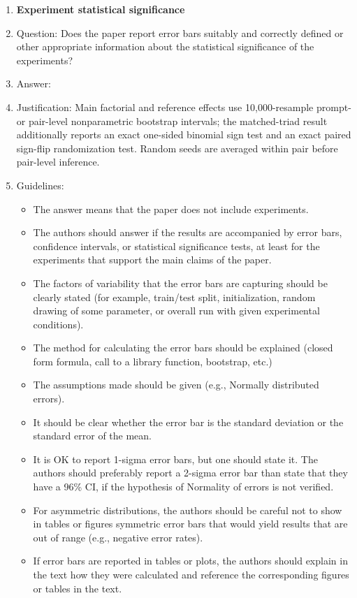 \documentclass[
]{article}
\begin{document}
\begin{enumerate}
\item {\bf Experiment statistical significance}
    \item[] Question: Does the paper report error bars suitably and correctly defined or other appropriate information about the statistical significance of the experiments?
    \item[] Answer: \answerYes{} %
    \item[] Justification: Main factorial and reference effects use 10,000-resample prompt- or pair-level nonparametric bootstrap intervals; the matched-triad result additionally reports an exact one-sided binomial sign test and an exact paired sign-flip randomization test. Random seeds are averaged within pair before pair-level inference.
    \item[] Guidelines:
    \begin{itemize}
        \item The answer \answerNA{} means that the paper does not include experiments.
        \item The authors should answer \answerYes{} if the results are accompanied by error bars, confidence intervals, or statistical significance tests, at least for the experiments that support the main claims of the paper.
        \item The factors of variability that the error bars are capturing should be clearly stated (for example, train/test split, initialization, random drawing of some parameter, or overall run with given experimental conditions).
        \item The method for calculating the error bars should be explained (closed form formula, call to a library function, bootstrap, etc.)
        \item The assumptions made should be given (e.g., Normally distributed errors).
        \item It should be clear whether the error bar is the standard deviation or the standard error of the mean.
        \item It is OK to report 1-sigma error bars, but one should state it. The authors should preferably report a 2-sigma error bar than state that they have a 96\% CI, if the hypothesis of Normality of errors is not verified.
        \item For asymmetric distributions, the authors should be careful not to show in tables or figures symmetric error bars that would yield results that are out of range (e.g., negative error rates).
        \item If error bars are reported in tables or plots, the authors should explain in the text how they were calculated and reference the corresponding figures or tables in the text.
    \end{itemize}


\end{enumerate}
\end{document}
